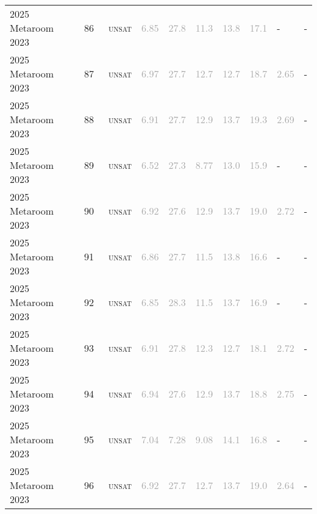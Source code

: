 \begin{center}
{\begin{longtable}{@{}llllllllll@{}}
2025 Metaroom 2023 & 86 & ~\textsc{unsat} & \textcolor{darkgray}{6.85} & \textcolor{darkgray}{27.8} & \textcolor{darkgray}{11.3} & \textcolor{darkgray}{13.8} & \textcolor{darkgray}{17.1} & - & - \\
2025 Metaroom 2023 & 87 & ~\textsc{unsat} & \textcolor{darkgray}{6.97} & \textcolor{darkgray}{27.7} & \textcolor{darkgray}{12.7} & \textcolor{darkgray}{12.7} & \textcolor{darkgray}{18.7} & \textcolor{darkgray}{2.65} & - \\
2025 Metaroom 2023 & 88 & ~\textsc{unsat} & \textcolor{darkgray}{6.91} & \textcolor{darkgray}{27.7} & \textcolor{darkgray}{12.9} & \textcolor{darkgray}{13.7} & \textcolor{darkgray}{19.3} & \textcolor{darkgray}{2.69} & - \\
2025 Metaroom 2023 & 89 & ~\textsc{unsat} & \textcolor{darkgray}{6.52} & \textcolor{darkgray}{27.3} & \textcolor{darkgray}{8.77} & \textcolor{darkgray}{13.0} & \textcolor{darkgray}{15.9} & - & - \\
2025 Metaroom 2023 & 90 & ~\textsc{unsat} & \textcolor{darkgray}{6.92} & \textcolor{darkgray}{27.6} & \textcolor{darkgray}{12.9} & \textcolor{darkgray}{13.7} & \textcolor{darkgray}{19.0} & \textcolor{darkgray}{2.72} & - \\
2025 Metaroom 2023 & 91 & ~\textsc{unsat} & \textcolor{darkgray}{6.86} & \textcolor{darkgray}{27.7} & \textcolor{darkgray}{11.5} & \textcolor{darkgray}{13.8} & \textcolor{darkgray}{16.6} & - & - \\
2025 Metaroom 2023 & 92 & ~\textsc{unsat} & \textcolor{darkgray}{6.85} & \textcolor{darkgray}{28.3} & \textcolor{darkgray}{11.5} & \textcolor{darkgray}{13.7} & \textcolor{darkgray}{16.9} & - & - \\
2025 Metaroom 2023 & 93 & ~\textsc{unsat} & \textcolor{darkgray}{6.91} & \textcolor{darkgray}{27.8} & \textcolor{darkgray}{12.3} & \textcolor{darkgray}{12.7} & \textcolor{darkgray}{18.1} & \textcolor{darkgray}{2.72} & - \\
2025 Metaroom 2023 & 94 & ~\textsc{unsat} & \textcolor{darkgray}{6.94} & \textcolor{darkgray}{27.6} & \textcolor{darkgray}{12.9} & \textcolor{darkgray}{13.7} & \textcolor{darkgray}{18.8} & \textcolor{darkgray}{2.75} & - \\
2025 Metaroom 2023 & 95 & ~\textsc{unsat} & \textcolor{darkgray}{7.04} & \textcolor{darkgray}{7.28} & \textcolor{darkgray}{9.08} & \textcolor{darkgray}{14.1} & \textcolor{darkgray}{16.8} & - & - \\
2025 Metaroom 2023 & 96 & ~\textsc{unsat} & \textcolor{darkgray}{6.92} & \textcolor{darkgray}{27.7} & \textcolor{darkgray}{12.7} & \textcolor{darkgray}{13.7} & \textcolor{darkgray}{19.0} & \textcolor{darkgray}{2.64} & - \\

\end{longtable}}
\end{center}
